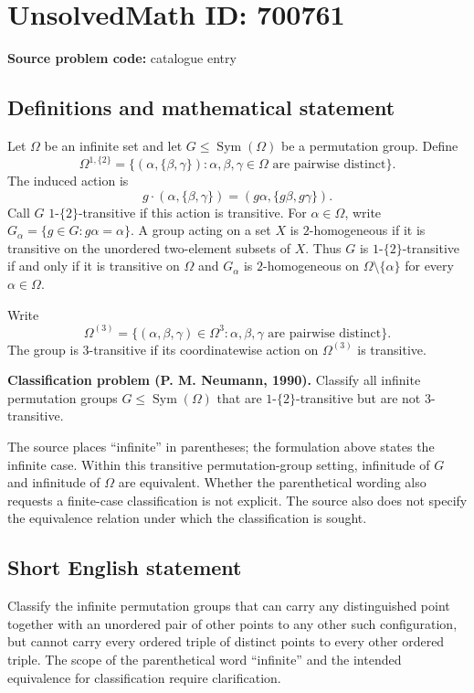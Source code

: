 \documentclass[11pt]{article}
\begin{document}
\section*{UnsolvedMath ID: 700761}
\textbf{Source problem code:} catalogue entry
\subsection{Definitions and mathematical statement}
Let \(\Omega\) be an infinite set and let \(G\leq \operatorname{Sym}(\Omega)\) be a permutation group. Define
\[
\Omega^{1,\{2\}}=\{(\alpha,\{\beta,\gamma\}):\alpha,\beta,\gamma\in\Omega\text{ are pairwise distinct}\}.
\]
The induced action is
\[
g\cdot(\alpha,\{\beta,\gamma\})=(g\alpha,\{g\beta,g\gamma\}).
\]
Call \(G\) \(1\text{-}\{2\}\)-transitive if this action is transitive. For \(\alpha\in\Omega\), write \(G_\alpha=\{g\in G:g\alpha=\alpha\}\). A group acting on a set \(X\) is \(2\)-homogeneous if it is transitive on the unordered two-element subsets of \(X\). Thus \(G\) is \(1\text{-}\{2\}\)-transitive if and only if it is transitive on \(\Omega\) and \(G_\alpha\) is \(2\)-homogeneous on \(\Omega\setminus\{\alpha\}\) for every \(\alpha\in\Omega\).

Write
\[
\Omega^{(3)}=\{(\alpha,\beta,\gamma)\in\Omega^3:\alpha,\beta,\gamma\text{ are pairwise distinct}\}.
\]
The group is \(3\)-transitive if its coordinatewise action on \(\Omega^{(3)}\) is transitive.

\textbf{Classification problem (P. M. Neumann, 1990).} Classify all infinite permutation groups \(G\leq\operatorname{Sym}(\Omega)\) that are \(1\text{-}\{2\}\)-transitive but are not \(3\)-transitive.

The source places ``infinite'' in parentheses; the formulation above states the infinite case. Within this transitive permutation-group setting, infinitude of \(G\) and infinitude of \(\Omega\) are equivalent. Whether the parenthetical wording also requests a finite-case classification is not explicit. The source also does not specify the equivalence relation under which the classification is sought.
\subsection{Short English statement}
Classify the infinite permutation groups that can carry any distinguished point together with an unordered pair of other points to any other such configuration, but cannot carry every ordered triple of distinct points to every other ordered triple. The scope of the parenthetical word ``infinite'' and the intended equivalence for classification require clarification.
\end{document}
